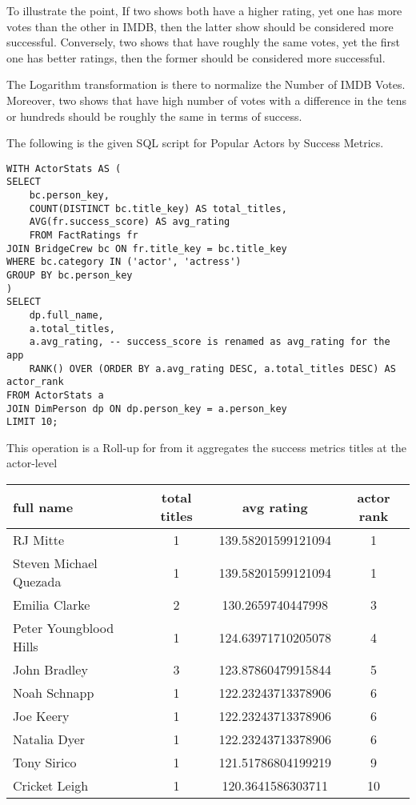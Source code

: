 To illustrate the point, If two shows both have a higher rating, yet one has more votes than the other in IMDB, then the latter show should be considered more successful. Conversely, two shows that have roughly the same votes, yet the first one has better ratings, then the former should be considered more successful. 

The Logarithm transformation is there to normalize the Number of IMDB Votes. Moreover, two shows that have high number of votes with a difference in the tens or hundreds should be roughly the same in terms of success.

The following is the given SQL script for Popular Actors by Success Metrics.
\begin{lstlisting}[style=SQLStyle]
WITH ActorStats AS (
SELECT 
	bc.person_key,
	COUNT(DISTINCT bc.title_key) AS total_titles,
	AVG(fr.success_score) AS avg_rating
	FROM FactRatings fr
JOIN BridgeCrew bc ON fr.title_key = bc.title_key
WHERE bc.category IN ('actor', 'actress')
GROUP BY bc.person_key
)
SELECT 
	dp.full_name,
	a.total_titles, 
	a.avg_rating, -- success_score is renamed as avg_rating for the app
	RANK() OVER (ORDER BY a.avg_rating DESC, a.total_titles DESC) AS actor_rank
FROM ActorStats a
JOIN DimPerson dp ON dp.person_key = a.person_key
LIMIT 10;
\end{lstlisting}

This operation is a Roll-up for from it aggregates the success metrics titles at the actor-level

\begin{center}
\begin{tabular}{|p{2cm}|c|c|c|}
\hline
full name & total titles & avg rating & actor rank\\
\hline
RJ Mitte & 1 & 139.58201599121094 & 1\\
Steven Michael Quezada & 1 & 139.58201599121094 & 1\\
Emilia Clarke & 2 & 130.2659740447998 & 3\\
Peter Youngblood Hills & 1 & 124.63971710205078 & 4\\
John Bradley & 3 & 123.87860479915844 & 5\\
Noah Schnapp & 1 & 122.23243713378906 & 6\\
Joe Keery & 1 & 122.23243713378906 & 6\\
Natalia Dyer & 1 & 122.23243713378906 & 6\\
Tony Sirico & 1 & 121.51786804199219 & 9\\
Cricket Leigh & 1 & 120.3641586303711 & 10\\
\hline
\end{tabular}
\end{center}


